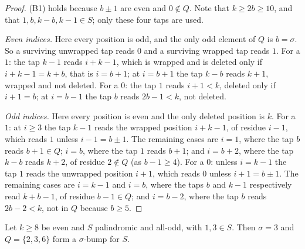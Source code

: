\begin{proof}
(B1) holds because $b\pm1$ are even and $0\notin Q$. Note that $k\ge2b\ge10$,
and that $1,b,k-b,k-1\in S$; only these four taps are used.

\emph{Even indices.} Here every position is odd, and the only odd element of
$Q$ is $b=\sigma$. So a surviving unwrapped tap reads $0$ and a surviving
wrapped tap reads $1$. For a $1$: the tap $k-1$ reads $i+k-1$, which is wrapped
and is deleted only if $i+k-1=k+b$, that is $i=b+1$; at $i=b+1$ the tap $k-b$
reads $k+1$, wrapped and not deleted. For a $0$: the tap $1$ reads $i+1<k$,
deleted only if $i+1=b$; at $i=b-1$ the tap $b$ reads $2b-1<k$, not deleted.

\emph{Odd indices.} Here every position is even and the only deleted position
is $k$. For a $1$: at $i\ge3$ the tap $k-1$ reads the wrapped position
$i+k-1$, of residue $i-1$, which reads $1$ unless $i-1=b\pm1$. The remaining
cases are $i=1$, where the tap $b$ reads $b+1\in Q$; $i=b$, where the tap $1$
reads $b+1$; and $i=b+2$, where the tap $k-b$ reads $k+2$, of residue
$2\notin Q$ (as $b-1\ge4$). For a $0$: unless $i=k-1$ the tap $1$ reads the
unwrapped position $i+1$, which reads $0$ unless $i+1=b\pm1$. The remaining
cases are $i=k-1$ and $i=b$, where the taps $b$ and $k-1$ respectively read
$k+b-1$, of residue $b-1\in Q$; and $i=b-2$, where the tap $b$ reads
$2b-2<k$, not in $Q$ because $b\ge5$.
\end{proof}

\begin{lemma}
\label{lem:allodd-three4}
Let $k\ge8$ be even and $S$ palindromic and all-odd, with $1,3\in S$. Then
$\sigma=3$ and $Q=\{2,3,6\}$ form a $\sigma$-bump for $S$.
\end{lemma}

